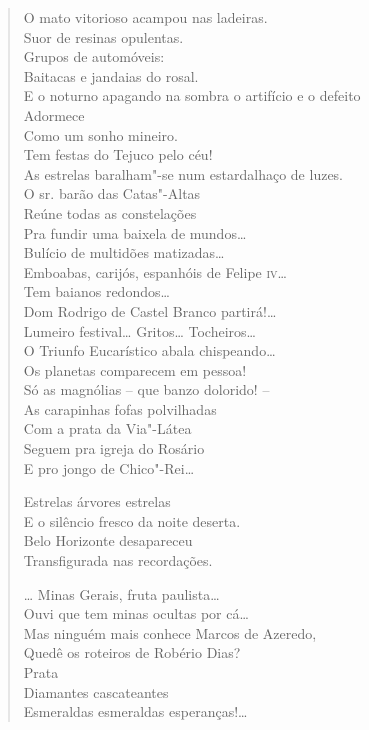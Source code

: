\begin{verse}
O mato vitorioso acampou nas ladeiras.\\
Suor de resinas opulentas.\\
Grupos de automóveis:\\
Baitacas e jandaias do rosal.\\
E o noturno apagando na sombra o artifício e o defeito\\
Adormece\\
Como um sonho mineiro.\\
Tem festas do Tejuco pelo céu!\\
As estrelas baralham"-se num estardalhaço de luzes.\\
O sr. barão das Catas"-Altas\\
Reúne todas as constelações\\
Pra fundir uma baixela de mundos\ldots{}\\
Bulício de multidões matizadas\ldots{}\\
Emboabas, carijós, espanhóis de Felipe \textsc{iv}\ldots{}\\
Tem baianos redondos\ldots{}\\
Dom Rodrigo de Castel Branco partirá!\ldots{}\\
Lumeiro festival\ldots{} Gritos\ldots{} Tocheiros\ldots{}\\
O Triunfo Eucarístico abala chispeando\ldots{}\\
Os planetas comparecem em pessoa!\\
Só as magnólias -- que banzo dolorido! --\\
As carapinhas fofas polvilhadas\\
Com a prata da Via"-Látea\\
Seguem pra igreja do Rosário\\
E pro jongo de Chico"-Rei\ldots{}

Estrelas árvores estrelas\\
E o silêncio fresco da noite deserta.\\
Belo Horizonte desapareceu\\
Transfigurada nas recordações.

\ldots{} Minas Gerais, fruta paulista\ldots{}\\
Ouvi que tem minas ocultas por cá\ldots{}\\
Mas ninguém mais conhece Marcos de Azeredo,\\
Quedê os roteiros de Robério Dias?\\
\quad\quad\quad{}Prata\\
\quad\quad{}Diamantes cascateantes\\
Esmeraldas esmeraldas esperanças!\ldots{}


\end{verse}
